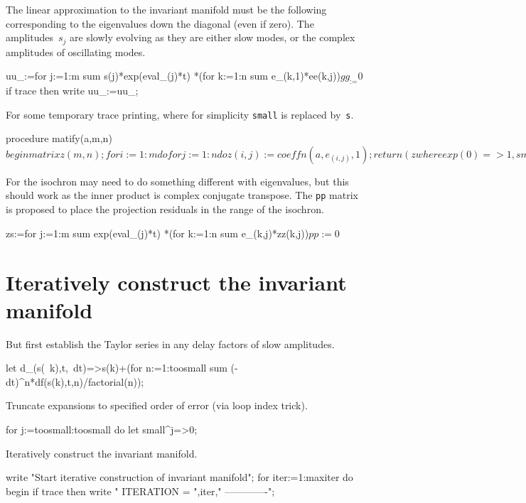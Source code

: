 \documentclass[11pt,a5paper]{article}
\begin{document}
The linear approximation to the invariant manifold must be
the following corresponding to the eigenvalues down the
diagonal (even if zero). The amplitudes~$s_j$ are slowly
evolving as they are either slow modes, or the complex
amplitudes of oscillating modes.
\begin{reduce}
uu_:=for j:=1:m sum s(j)*exp(eval_(j)*t)
  *(for k:=1:n sum e_(k,1)*ee(k,j))$
gg_:=0$
if trace then write uu_:=uu_;
\end{reduce}

For some temporary trace printing, where for simplicity
\verb|small| is replaced by~\verb|s|.
\begin{reduce}
procedure matify(a,m,n)$
  begin matrix z(m,n);
    for i:=1:m do for j:=1:n do z(i,j):=coeffn(a,e_(i,j),1);
    return (z where {exp(0)=>1,small=>s}); 
    end$
\end{reduce}

For the isochron may need to do something different with
eigenvalues, but this should work as the inner product is
complex conjugate transpose. The \verb|pp| matrix is
proposed to place the projection residuals in the range of
the isochron. 
\begin{reduce}
zs:=for j:=1:m sum exp(eval_(j)*t)
  *(for k:=1:n sum e_(k,j)*zz(k,j))$
pp:=0$
\end{reduce}




\section{Iteratively construct the invariant manifold}

But first establish the Taylor series in any delay factors
of slow amplitudes.
\begin{reduce}
let d_(s(~k),t,~dt)=>s(k)+(for n:=1:toosmall sum 
        (-dt)^n*df(s(k),t,n)/factorial(n));
\end{reduce}

Truncate expansions to specified order of error (via loop
index trick).
\begin{reduce}
for j:=toosmall:toosmall do let small^j=>0;
\end{reduce}

Iteratively construct the invariant manifold.
\begin{reduce}
write "Start iterative construction of invariant manifold";
for iter:=1:maxiter do begin
if trace then write "
ITERATION = ",iter,"
-------------";
\end{reduce}
\end{document}
